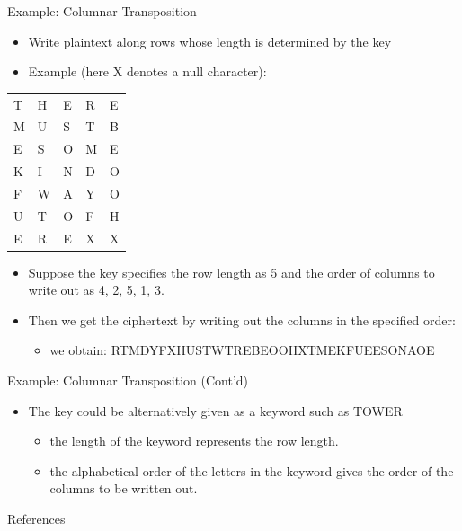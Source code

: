 \documentclass[presentation]{beamer}
\begin{document}
\begin{frame}[label=sec-16]{Example: Columnar Transposition}
\begin{itemize}
\item Write plaintext along rows whose length is determined by the key
\item Example (here X denotes a null character):
\end{itemize}
\begin{center}
\begin{tabular}{lllll}
T & H & E & R & E\\
M & U & S & T & B\\
E & S & O & M & E\\
K & I & N & D & O\\
F & W & A & Y & O\\
U & T & O & F & H\\
E & R & E & X & X\\
\end{tabular}
\end{center}
\begin{itemize}
\item Suppose the key specifies the row length as 5 and the order of columns to write out as 4, 2, 5, 1, 3.
\item Then we get the ciphertext by writing out the columns in the specified order:
\begin{itemize}
\item we obtain: RTMDYFXHUSTWTREBEOOHXTMEKFUEESONAOE
\end{itemize}
\end{itemize}
\end{frame}
\begin{frame}[label=sec-17]{Example: Columnar Transposition (Cont'd)}
\begin{itemize}
\item The key could be alternatively given as a keyword such as TOWER
\begin{itemize}
\item the length of the keyword represents the row length.
\item the alphabetical order of the letters in the keyword gives the order of the columns to be written out.
\end{itemize}
\end{itemize}
\end{frame}
\begin{frame}[label=sec-18]{References}

\end{frame}
\end{document}
